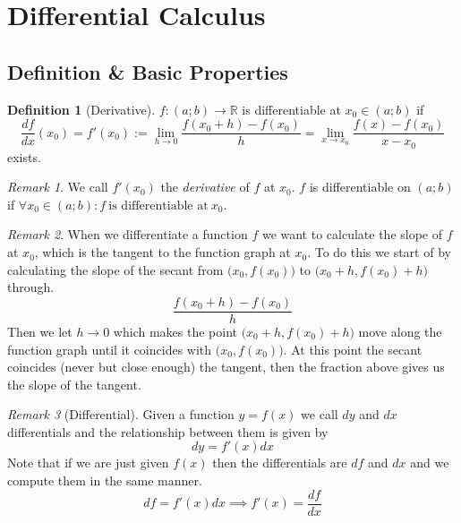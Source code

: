 \documentclass[english,titlepage]{uzhpub}
\theoremstyle{definition}
\newtheorem{definition}{Definition}[section]
\theoremstyle{plain}
\theoremstyle{remark}
\newtheorem*{remark}{Remark}
\theoremstyle{example}
\begin{document}
   \begin{center}
      
   \end{center}

   \section{Differential Calculus}
   \subsection{Definition \& Basic Properties}
   \begin{definition}[Derivative]
      \(f: (a;b) \to \mathbb{R}\) is differentiable at \(x_0 \in (a; b)\) if
      \[\frac{df}{dx} (x_0) = f'(x_0) := \lim_{h \to 0} \frac{f(x_0 + h) - f(x_0)}{h} = \lim_{x \to x_0} \frac{f(x) - f(x_0)}{x - x_0}\]
      exists.
   \end{definition}
   \begin{remark}
      We call \(f'(x_0)\) the \textit{derivative} of \(f\) at \(x_0\).
      \(f\) is differentiable on \((a; b)\) if \(\forall x_0 \in (a;b): f~\text{is differentiable at}~x_0\).
   \end{remark}
   \begin{remark}
      When we differentiate a function \(f\) we want to calculate the slope of \(f\) at \(x_0\), which is the tangent to the function graph at \(x_0\).
      To do this we start of by calculating the slope of the secant from \(\big(x_0, f(x_0)\big)\) to \(\big(x_0 + h, f(x_0) + h\big)\) through.
      \[\frac{f(x_0 + h) - f(x_0)}{h}\]
      Then we let \(h \to 0\) which makes the point \(\big(x_0 + h, f(x_0) + h\big)\) move along the function graph until it coincides with \(\big(x_0, f(x_0)\big)\).
      At this point the secant coincides (never but close enough) the tangent, then the fraction above gives us the slope of the tangent.
   \end{remark}
   \begin{remark}[Differential]
      Given a function \(y = f(x)\) we call \(dy\) and \(dx\) differentials and the relationship between them is given by
      \[dy = f'(x)dx\]
      Note that if we are just given \(f(x)\) then the differentials are \(df\) and \(dx\) and we compute them in the same manner.
      \[df = f'(x)dx \implies f'(x) = \frac{df}{dx}\]
   \end{remark}

   \begin{center}
      
   \end{center}
\end{document}
